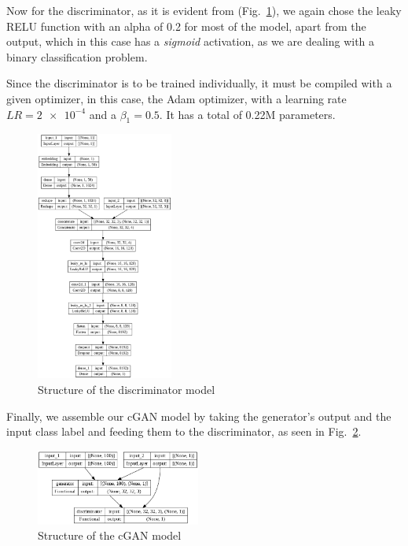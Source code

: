 \documentclass[conference]{IEEEtran}
\begin{document}
Now for the discriminator, as it is evident from (Fig.~\ref{fig:DiscStruct}), we again chose the leaky RELU function with an alpha of 0.2 for most of the model, apart from the output, which in this case has a \textit{sigmoid} activation, as we are dealing with a binary classification problem.

Since the discriminator is to be trained individually, it must be compiled with a given optimizer, in this case, the Adam optimizer, with a learning rate $LR=\num{2e-4}$ and a $\beta_1=0.5$. It has a total of 0.22M parameters.

\begin{figure}[htbp]
    \centering
    \includegraphics[width=0.4\textwidth]{paper/images/summary/discriminator.png}
    \caption{Structure of the discriminator model}
    \label{fig:DiscStruct}
\end{figure}

Finally, we assemble our cGAN model by taking the generator's output and the input class label and feeding them to the discriminator, as seen in Fig.~\ref{fig:cGANStruct}.

\begin{figure}[htbp]
    \centering
    \includegraphics[width=0.48\textwidth]{paper/images/summary/cgan.png}
    \caption{Structure of the cGAN model}
    \label{fig:cGANStruct}
\end{figure}
\end{document}
